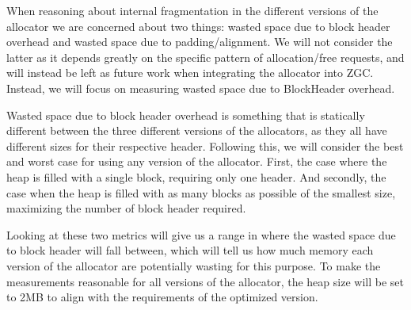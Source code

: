 When reasoning about internal fragmentation in the different versions of the allocator we are concerned about two things: wasted space due to block header overhead and wasted space due to padding/alignment. We will not consider the latter as it depends greatly on the specific pattern of allocation/free requests, and will instead be left as future work when integrating the allocator into ZGC. Instead, we will focus on measuring wasted space due to BlockHeader overhead.

Wasted space due to block header overhead is something that is statically different between the three different versions of the allocators, as they all have different sizes for their respective header. Following this, we will consider the best and worst case for using any version of the allocator. First, the case where the heap is filled with a single block, requiring only one header. And secondly, the case when the heap is filled with as many blocks as possible of the smallest size, maximizing the number of block header required.

Looking at these two metrics will give us a range in where the wasted space due to block header will fall between, which will tell us how much memory each version of the allocator are potentially wasting for this purpose. To make the measurements reasonable for all versions of the allocator, the heap size will be set to 2MB to align with the requirements of the optimized version.




